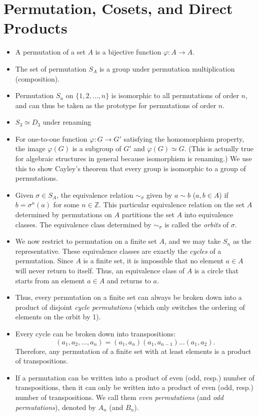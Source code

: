 \documentclass{article}
\newcommand{\Z}{\mathbb{Z}}
\renewcommand{\phi}{\varphi}
\begin{document}
\section{Permutation, Cosets, and Direct Products}
\begin{itemize}
    \item A permutation of a set $A$ is a bijective function $\phi: A \to A$.
    \item The set of permutation $S_A$ is a group under permutation multiplication (composition).
    \item Permutation $S_n$ on $\{1,2,\dots,n\}$ is isomorphic to all permutations of order $n$, and can thus be taken as the prototype for permutations of order $n$.
    \item $S_3 \simeq D_3$ under renaming
    \item For one-to-one function $\phi: G \to G'$ satisfying the homomorphism property, the image $\phi(G)$ is a subgroup of $G'$ and $\phi(G) \simeq G$. (This is actually true for algebraic structures in general because isomorphism is renaming.) We use this to show Cayley's theorem that every group is isomorphic to a group of permutations.
    \item Given $\sigma \in S_A$, the equivalence relation $\sim_\sigma$ given by $a \sim b$ ($a,b \in A$) if $b = \sigma^n(a)$ for some $n \in \Z$. This particular equivalence relation on the set $A$ determined by permutations on $A$ partitions the set $A$ into equivalence classes. The equivalence class determined by $\sim_\sigma$ is called the \textit{orbits} of $\sigma$.
    \item We now restrict to permutation on a finite set $A$, and we may take $S_n$ as the representative. These equivalence classes are exactly the \textit{cycles} of a permutation. Since $A$ is a finite set, it is impossible that no element $a \in A$ will never return to itself. Thus, an equivalence class of $A$ is a circle that starts from an element $a \in A$ and returns to $a$.
    \item Thus, every permutation on a finite set can always be broken down into a product of disjoint \textit{cycle permutations} (which only switches the ordering of elements on the orbit by 1).
    \item Every cycle can be broken down into transpositions: $$(a_1, a_2, \dots, a_n) = (a_1, a_n) (a_1, a_{n-1}) \dots (a_1,a_2).$$ Therefore, any permutation of a finite set with at least elements is a product of transpositions.
    \item If a permutation can be written into a product of even (odd, resp.) number of transpositions, then it can only be written into a product of even (odd, resp.) number of transpositions. We call them \textit{even permutations} (and \textit{odd permutations}), denoted by $A_n$ (and $B_n$).

\end{itemize}
\end{document}
